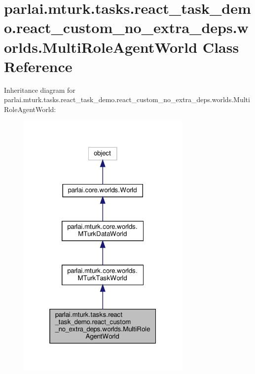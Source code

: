 \hypertarget{classparlai_1_1mturk_1_1tasks_1_1react__task__demo_1_1react__custom__no__extra__deps_1_1worlds_1_1MultiRoleAgentWorld}{}\section{parlai.\+mturk.\+tasks.\+react\+\_\+task\+\_\+demo.\+react\+\_\+custom\+\_\+no\+\_\+extra\+\_\+deps.\+worlds.\+Multi\+Role\+Agent\+World Class Reference}
\label{classparlai_1_1mturk_1_1tasks_1_1react__task__demo_1_1react__custom__no__extra__deps_1_1worlds_1_1MultiRoleAgentWorld}


Inheritance diagram for parlai.\+mturk.\+tasks.\+react\+\_\+task\+\_\+demo.\+react\+\_\+custom\+\_\+no\+\_\+extra\+\_\+deps.\+worlds.\+Multi\+Role\+Agent\+World\+:\nopagebreak
\begin{figure}[H]
\begin{center}
\leavevmode
\includegraphics[width=241pt]{d0/d61/classparlai_1_1mturk_1_1tasks_1_1react__task__demo_1_1react__custom__no__extra__deps_1_1worlds_1b87f5004bcbbd61735af49ebbad4bcbe}
\end{center}
\end{figure}


